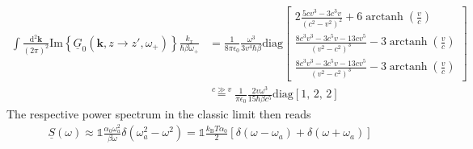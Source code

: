 \documentclass[11pt]{article}
\newcommand{\vv}[1]{\mathbf{#1}}
\newcommand{\dd}[0]{\mathrm{d}}
\DeclareMathOperator\arctanh{arctanh}
\begin{document}
\begin{align}
  \int\frac{\dd^2\vv k}{(2\pi)^2}  \mathrm{Im}\left\{\underline{G}_0(\vv k, z\to z',\omega_+)\right\}\frac{k_x}{\hbar\beta\omega_+} 
  &=
  \frac{1}{8\pi\epsilon_0}
  \frac{\omega^3}{3v^4\hbar\beta}
  \mathrm{diag}
  \begin{bmatrix}
    2\frac{5 c v^3-3 c^3 v}{\left(c^2-v^2\right)^2}+6 \arctanh\left(\frac{v}{c}\right)
    \\
    \frac{8 c^3 v^3-3 c^5 v-13c v^5}{\left(v^2-c^2\right)^3}-3 \arctanh\left(\frac{v}{c}\right)
    \\
    \frac{8 c^3 v^3-3 c^5 v-13c v^5}{\left(v^2-c^2\right)^3}-3 \arctanh\left(\frac{v}{c}\right)
  \end{bmatrix}
  \\
  &\stackrel{c\gg v}=
  \frac{1}{\pi\epsilon_0}
  \frac{2 v \omega^3}{15 \hbar\beta c^5}
  \mathrm{diag}\left[1,\,2,\,2\right]
\end{align}
The respective power spectrum in the classic limit then reads
\begin{align}
  \underline{S}(\omega)\approx\mathbb{1}
  \frac{ \alpha_0 \omega_a^2}{\beta\omega}\delta(\omega_a^2-\omega^2)=\mathbb{1}\frac{k_\mathrm{B}T\alpha_0}{2}\left[\delta(\omega-\omega_a)+\delta(\omega+\omega_a)\right]
\end{align}

\end{document}
